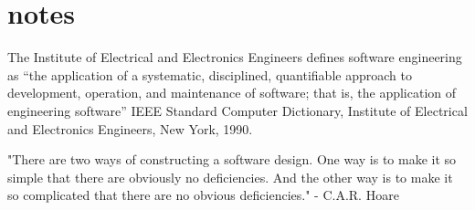 \chapter{notes}

The Institute of Electrical and Electronics Engineers defines software engineering as 
“the application of a systematic, disciplined, quantifiable approach to development, 
operation, and maintenance of software; that is, the application of engineering software”
IEEE Standard Computer Dictionary, Institute
of Electrical and Electronics Engineers, New
York, 1990.

"There are two ways of constructing a software design. One way is to make it so simple 
that there are obviously no deficiencies. And the other way is to make it so complicated that
there are no obvious deficiencies."
- C.A.R. Hoare